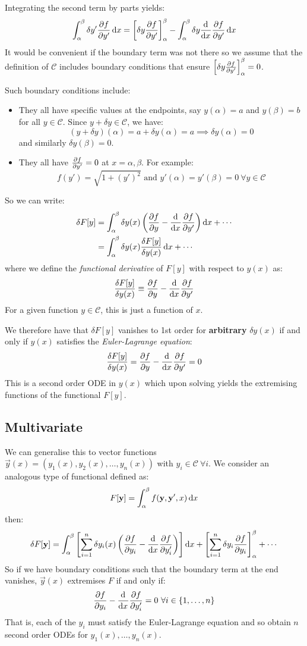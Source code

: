 \documentclass[../main.tex]{subfiles}
\begin{document}
Integrating the second term by parts yields:
\[
  \int_{\alpha}^{\beta} \delta y' \pderiv{f}{y'} \d{x} = \eval{\delta y \pderiv{f}{y'}}{\alpha}{\beta} - \int_{\alpha}^{\beta} \delta y \deriv{}{x} \pderiv{f}{y'} \d{x}
\]
It would be convenient if the boundary term was not there so we assume that the definition of $\mathscr{C}$ includes boundary conditions that ensure $\eval{\delta y \pderiv{f}{y'}}{\alpha}{\beta} = 0$.

Such boundary conditions include:
\begin{itemize}
  \item They all have specific values at the endpoints, say $y(\alpha) = a$ and $y(\beta) = b$ for all $y \in \mathscr{C}$.
    Since $y + \delta y \in \mathscr{C}$, we have:
    \[
      (y + \delta y)(\alpha) = a + \delta y(\alpha) = a \implies \delta y(\alpha) = 0
    \]
    and similarly $\delta y(\beta) = 0$.
  \item They all have $\pderiv{f}{y'} = 0$ at $x = \alpha, \beta$.
    For example:
    \[
      f(y') = \sqrt{1 + (y')^2} \text{ and } y'(\alpha) = y'(\beta) = 0\ \forall y \in \mathscr{C}
    \]
\end{itemize}
So we can write:
\begin{align*}
  \delta F[y] &= \int_{\alpha}^{\beta} \delta y(x) \left(\pderiv{f}{y} - \deriv{}{x}\pderiv{f}{y'}\right) \d{x} + \cdots \\
              &= \int_{\alpha}^{\beta} \delta y(x) \frac{\delta F[y]}{\delta y(x)} \d{x} + \cdots
\end{align*}
where we define the \textit{functional derivative} of $F[y]$ with respect to $y(x)$ as:
\[
  \frac{\delta F[y]}{\delta y(x)} \equiv \pderiv{f}{y} - \deriv{}{x} \pderiv{f}{y'}
\]
For a given function $y \in \mathscr{C}$, this is just a function of $x$.

We therefore have that $\delta F[y]$ vanishes to 1st order for \textbf{arbitrary} $\delta y(x)$ if and only if $y(x)$ satisfies the \textit{Euler-Lagrange equation}:
\[
  \frac{\delta F[y]}{\delta y(x)} = \pderiv{f}{y} - \deriv{}{x} \pderiv{f}{y'} = 0
\]
This is a second order ODE in $y(x)$ which upon solving yields the extremising functions of the functional $F[y]$.
\subsection{Multivariate}
We can generalise this to vector functions $\vec{y}(x) = (y_1(x), y_2(x), \ldots, y_n(x))$ with $y_i \in \mathscr{C}\ \forall i$.
We consider an analogous type of functional defined as:
\[
  F[\vec{y}] = \int_{\alpha}^{\beta} f(\vec{y}, \vec{y}', x) \d{x}
\]
then:
\[
  \delta F[\vec{y}] = \int_{\alpha}^{\beta} \left[\sum_{i = 1}^{n} \delta y_i(x) \left(\pderiv{f}{y_i} - \deriv{}{x} \pderiv{f}{y_i'}\right)\right] \d{x} + \eval{\sum_{i = 1}^{n} \delta y_i \pderiv{f}{y_i}}{\alpha}{\beta} + \cdots
\]
So if we have boundary conditions such that the boundary term at the end vanishes, $\vec{y}(x)$ extremises $F$ if and only if:
\[
  \pderiv{f}{y_i} - \deriv{}{x} \pderiv{f}{y_i'} = 0\ \forall i \in \{1, \ldots, n\}
\]
That is, each of the $y_i$ must satisfy the Euler-Lagrange equation and so obtain $n$ second order ODEs for $y_1(x), \ldots, y_n(x)$.
\end{document}
